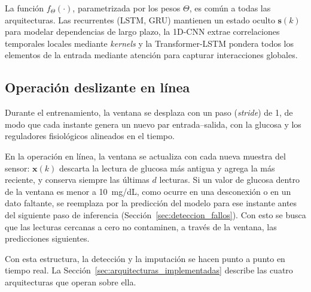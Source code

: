 \documentclass{report}
\begin{document}
La función $f_{\Theta}(\cdot)$, parametrizada por los pesos $\Theta$, es común a todas las arquitecturas. Las recurrentes (LSTM, GRU) mantienen un estado oculto $\mathbf{s}(k)$ para modelar dependencias de largo plazo, la 1D-CNN extrae correlaciones temporales locales mediante \textit{kernels} y la Transformer-LSTM pondera todos los elementos de la entrada mediante atención para capturar interacciones globales.

\subsection{Operación deslizante en línea}
\label{subsec:operacion_online}

Durante el entrenamiento, la ventana se desplaza con un paso (\textit{stride}) de 1, de modo que cada instante genera un nuevo par entrada--salida, con la glucosa y los reguladores fisiológicos alineados en el tiempo.

En la operación en línea, la ventana se actualiza con cada nueva muestra del sensor: $\mathbf{x}(k)$ descarta la lectura de glucosa más antigua y agrega la más reciente, y conserva siempre las últimas $d$ lecturas. Si un valor de glucosa dentro de la ventana es menor a 10~mg/dL, como ocurre en una desconexión o en un dato faltante, se reemplaza por la predicción del modelo para ese instante antes del siguiente paso de inferencia (Sección~\ref{sec:deteccion_fallos}). Con esto se busca que las lecturas cercanas a cero no contaminen, a través de la ventana, las predicciones siguientes.


Con esta estructura, la detección y la imputación se hacen punto a punto en tiempo real. La Sección~\ref{sec:arquitecturas_implementadas} describe las cuatro arquitecturas que operan sobre ella.

\end{document}
